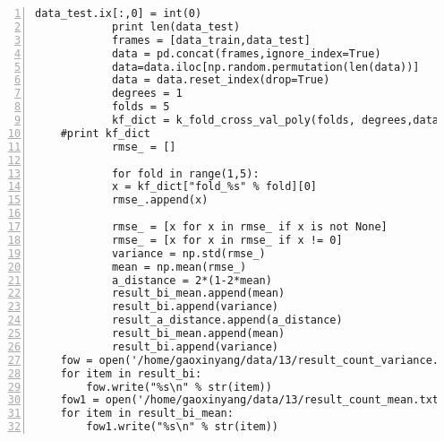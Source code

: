 \begin{lstlisting}[numbers=left, breaklines=true]
            data_test.ix[:,0] = int(0)
            print len(data_test)
            frames = [data_train,data_test]
            data = pd.concat(frames,ignore_index=True)
            data=data.iloc[np.random.permutation(len(data))]
            data = data.reset_index(drop=True)
    	    degrees = 1
    	    folds = 5
            kf_dict = k_fold_cross_val_poly(folds, degrees,data,False,24,weights)
    #print kf_dict
    	    rmse_ = []
            
    	    for fold in range(1,5):
        	x = kf_dict["fold_%s" % fold][0]
        	rmse_.append(x)
                    
            rmse_ = [x for x in rmse_ if x is not None]
            rmse_ = [x for x in rmse_ if x != 0]
    	    variance = np.std(rmse_)
            mean = np.mean(rmse_)
            a_distance = 2*(1-2*mean)
            result_bi_mean.append(mean) 
            result_bi.append(variance)
            result_a_distance.append(a_distance)
            result_bi_mean.append(mean) 
            result_bi.append(variance)
    fow = open('/home/gaoxinyang/data/13/result_count_variance.txt', 'w')
    for item in result_bi:
        fow.write("%s\n" % str(item)) 
    fow1 = open('/home/gaoxinyang/data/13/result_count_mean.txt', 'w')
    for item in result_bi_mean:
        fow1.write("%s\n" % str(item)) 
\end{lstlisting}









\begin{lstlisting}[numbers=left, breaklines=true]
\end{lstlisting}

